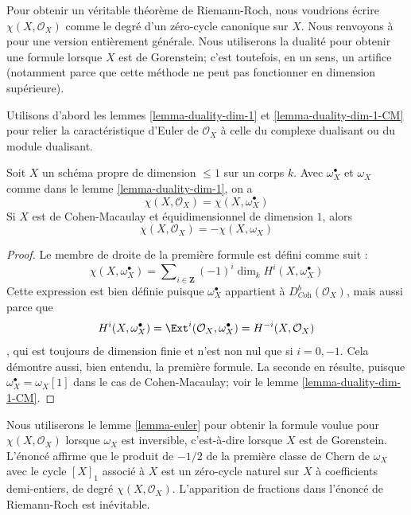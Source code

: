 \medskip\noindent
Pour obtenir un véritable théorème de Riemann-Roch, nous voudrions écrire $\chi(X, \mathcal{O}_X)$ comme le degré d'un zéro-cycle canonique sur $X$. Nous renvoyons à \cite{F} pour une version entièrement générale. Nous utiliserons la dualité pour obtenir une formule lorsque $X$ est de Gorenstein; c'est toutefois, en un sens, un artifice (notamment parce que cette méthode ne peut pas fonctionner en dimension supérieure).

\medskip\noindent
Utilisons d'abord les lemmes \ref{lemma-duality-dim-1} et \ref{lemma-duality-dim-1-CM} pour relier la caractéristique d'Euler de $\mathcal{O}_X$ à celle du complexe dualisant ou du module dualisant.

\begin{lemma}
\label{lemma-euler}
Soit $X$ un schéma propre de dimension $\leq 1$ sur un corps $k$. Avec $\omega_X^\bullet$ et $\omega_X$ comme dans le lemme \ref{lemma-duality-dim-1}, on a $$
\chi(X, \mathcal{O}_X) = \chi(X, \omega_X^\bullet)
$$ Si $X$ est de Cohen-Macaulay et équidimensionnel de dimension $1$, alors
$$
\chi(X, \mathcal{O}_X) = - \chi(X, \omega_X)
$$
\end{lemma}

\begin{proof}
Le membre de droite de la première formule est défini comme suit : $$
\chi(X, \omega_X^\bullet) =
\sum\nolimits_{i \in \mathbf{Z}} (-1)^i\dim_k H^i(X, \omega_X^\bullet)
$$ Cette expression est bien définie puisque $\omega_X^\bullet$ appartient à $D^b_{\textit{Coh}}(\mathcal{O}_X)$, mais aussi parce que $$
H^i(X, \omega_X^\bullet) =
\Ext^i(\mathcal{O}_X, \omega_X^\bullet) =
H^{-i}(X, \mathcal{O}_X)
$$, qui est toujours de dimension finie et n'est non nul que si $i = 0, -1$. Cela démontre aussi, bien entendu, la première formule. La seconde en résulte, puisque $\omega_X^\bullet = \omega_X[1]$ dans le cas de Cohen-Macaulay; voir le lemme \ref{lemma-duality-dim-1-CM}.
\end{proof}

\noindent
Nous utiliserons le lemme \ref{lemma-euler} pour obtenir la formule voulue pour $\chi(X, \mathcal{O}_X)$ lorsque $\omega_X$ est inversible, c'est-à-dire lorsque $X$ est de Gorenstein. L'énoncé affirme que le produit de $-1/2$ de la première classe de Chern de $\omega_X$ avec le cycle $[X]_1$ associé à $X$ est un zéro-cycle naturel sur $X$ à coefficients demi-entiers, de degré $\chi(X, \mathcal{O}_X)$. L'apparition de fractions dans l'énoncé de Riemann-Roch est inévitable.

